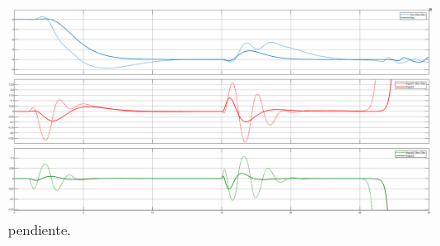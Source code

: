 \begin{figure}[H]
	\centering
	\includegraphics[width=\linewidth]{../Analisis de Resultados/ImagenesAnalisis de Resultados/disc_vs_ideal_vars.png}
	\caption{pendiente.}	
	\label{fig:disc_vs_ideal_vars}
\end{figure}


%